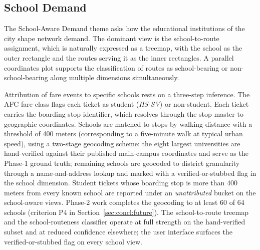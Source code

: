 \subsection*{School Demand}
\label{sec:solution:viz:school}

The School-Aware Demand theme asks how the educational institutions of the
city shape network demand. The dominant view is the school-to-route
assignment, which is naturally expressed as a treemap, with the school as
the outer rectangle and the routes serving it as the inner rectangles. A
parallel coordinates plot supports the classification of routes as
school-bearing or non-school-bearing along multiple dimensions
simultaneously.

Attribution of fare events to specific schools rests on a three-step
inference. The AFC fare class flags each ticket as student
(\textit{HS-SV}) or non-student. Each ticket carries the boarding stop
identifier, which resolves through the stop master to geographic
coordinates. Schools are matched to stops by walking distance with a
threshold of 400 meters (corresponding to a five-minute walk at
typical urban speed), using a two-stage geocoding scheme: the eight
largest universities are hand-verified against their published
main-campus coordinates and serve as the Phase-1 ground truth;
remaining schools are geocoded to district granularity through a
name-and-address lookup and marked with a verified-or-stubbed flag in
the school dimension. Student tickets whose boarding stop is more than
400 meters from every known school are reported under an
\textit{unattributed} bucket on the school-aware views. Phase-2 work
completes the geocoding to at least 60 of 64 schools (criterion P4 in
Section~\ref{sec:concl:future}). The school-to-route treemap and the
school-routeness classifier operate at full strength on the
hand-verified subset and at reduced confidence elsewhere; the user
interface surfaces the verified-or-stubbed flag on every school view.

